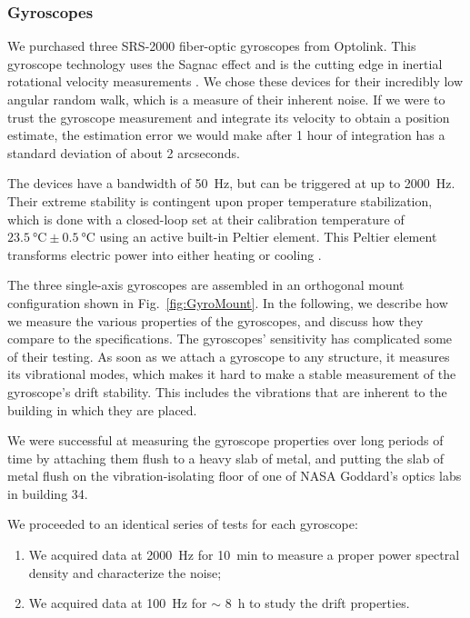 \subsubsection{Gyroscopes}
\label{subsec:gyros}

We purchased three SRS-2000 fiber-optic gyroscopes from Optolink. This gyroscope technology uses the Sagnac effect and is the cutting edge in inertial rotational velocity measurements \citep[for a review of the state-of-the-art see, \textit{e.g.}][]{ElBadaoui:2014fr}. We chose these devices for their incredibly low angular random walk, which is a measure of their inherent noise. If we were to trust the gyroscope measurement and integrate its velocity to obtain a position estimate, the estimation error we would make after 1 hour of integration has a standard deviation of about 2 arcseconds.

The devices have a bandwidth of \SI{50}{\hertz}, but can be triggered at up to \SI{2000}{\hertz}. Their extreme stability is contingent upon proper temperature stabilization, which is done with a closed-loop set at their calibration temperature of $\SI{23.5}{\celsius}\pm\SI{0.5}{\celsius}$ using an active built-in Peltier element. This Peltier element transforms electric power into either heating or cooling \citep{Peltier:1834vu}.

The three single-axis gyroscopes are assembled in an orthogonal mount configuration shown in Fig.~\ref{fig:GyroMount}. In the following, we describe how we measure the various properties of the gyroscopes, and discuss how they compare to the specifications.
The gyroscopes' sensitivity has complicated some of their testing. As soon as we attach a gyroscope to any structure, it measures its vibrational modes, which makes it hard to make a stable measurement of the gyroscope's drift stability. This includes the vibrations that are inherent to the building in which they are placed.

We were successful at measuring the gyroscope properties over long periods of time by attaching them flush to a heavy slab of metal, and putting the slab of metal flush on the vibration-isolating floor of one of NASA Goddard's optics labs in building 34.

We proceeded to an identical series of tests for each gyroscope:
\begin{enumerate}
\item We acquired data at \SI{2000}{\hertz} for \SI{10}{\minute} to measure a proper power spectral density and characterize the noise;
\item We acquired data at \SI{100}{\hertz} for $\sim$ \SI{8}{\hour} to study the drift properties.
\end{enumerate}

